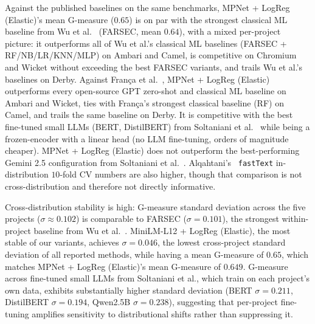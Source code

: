 Against the published baselines on the same benchmarks, MPNet + LogReg (Elastic)'s mean G-measure ($0.65$) is on par with the strongest classical ML baseline from Wu et al.~\cite{wu2022data-quality} (FARSEC, mean $0.64$), with a mixed per-project picture: it outperforms all of Wu et al.'s classical ML baselines (FARSEC + RF/NB/LR/KNN/MLP) on Ambari and Camel, is competitive on Chromium and Wicket without exceeding the best FARSEC variants, and trails Wu et al.'s baselines on Derby.
Against França et al.~\cite{franca2025gpts}, MPNet + LogReg (Elastic) outperforms every open-source GPT zero-shot and classical ML baseline on Ambari and Wicket, ties with França's strongest classical baseline (RF) on Camel, and trails the same baseline on Derby.
It is competitive with the best fine-tuned small LLMs (BERT, DistilBERT) from Soltaniani et al.~\cite{soltaniani2026evaluating-llms} while being a frozen-encoder with a linear head (no LLM fine-tuning, orders of magnitude cheaper).
MPNet + LogReg (Elastic) does not outperform the best-performing Gemini 2.5 configuration from Soltaniani et al.~\cite{soltaniani2026evaluating-llms}.
Alqahtani's~\cite{alqahtani2024fasttext} \texttt{fastText} in-distribution $10$-fold CV numbers are also higher, though that comparison is not cross-distribution and therefore not directly informative.

\begin{table}[t]
    \centering
    \caption{Per-Project G-Measure Heatmap Across All Evaluated Models on the Five Wu et al.\ Benchmarks.}
    \label{fig:c2-wu-summary}
    
\end{table}

Cross-distribution stability is high: G-measure standard deviation across the five projects ($\sigma \approx 0.102$) is comparable to FARSEC ($\sigma = 0.101$), the strongest within-project baseline from Wu et al.~\cite{wu2022data-quality}.
MiniLM-L12 + LogReg (Elastic), the most stable of our variants, achieves $\sigma = 0.046$, the lowest cross-project standard deviation of all reported methods, while having a mean G-measure of $0.65$, which matches MPNet + LogReg (Elastic)'s mean G-measure of  $0.649$.
G-measure across fine-tuned small LLMs from Soltaniani et al., which train on each project's own data, exhibits substantially higher standard deviation (BERT $\sigma = 0.211$, DistilBERT $\sigma = 0.194$, Qwen2.5B $\sigma = 0.238$), suggesting that per-project fine-tuning amplifies sensitivity to distributional shifts rather than suppressing it.

